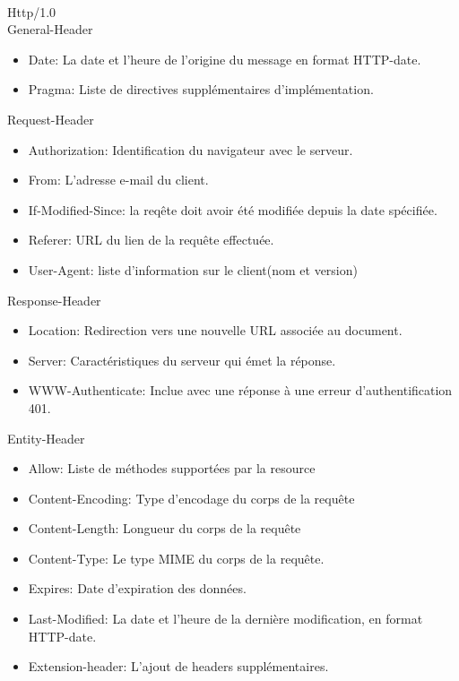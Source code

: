 \documentclass{scrreprt}
\begin{document}
\\

Http/1.0\\
    General-Header\\
        \begin{itemize}
        \item Date: La date et l'heure de l'origine du message en format HTTP-date.
        \item Pragma: Liste de directives supplémentaires d'implémentation.
        \end{itemize}
    Request-Header\\
        \begin{itemize}
        \item Authorization: Identification du navigateur avec le serveur.
        \item From: L'adresse e-mail du client.      
        \item If-Modified-Since: la reqête doit avoir été modifiée depuis la date spécifiée.
        \item Referer: URL du lien de la requête effectuée.          
        \item User-Agent: liste d'information sur le client(nom et version)       
        \end{itemize}
    Response-Header\\
        \begin{itemize}
        \item Location: Redirection vers une nouvelle URL associée au document.           
        \item Server: Caractéristiques du serveur qui émet la réponse.          
        \item WWW-Authenticate: Inclue avec une réponse à une erreur d'authentification 401.
        \end{itemize}
    Entity-Header\\
        \begin{itemize}
        \item Allow: Liste de méthodes supportées par la resource                
        \item Content-Encoding: Type d'encodage du corps de la requête  
        \item Content-Length: Longueur du corps de la requête    
        \item Content-Type: Le type MIME du corps de la requête.      
        \item Expires: Date d'expiration des données.           
        \item Last-Modified: La date et l'heure de la dernière modification, en format HTTP-date.     
        \item Extension-header: L'ajout de headers supplémentaires.
        \end{itemize}
\end{document}
